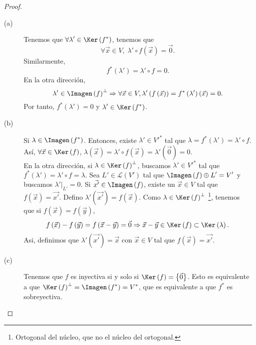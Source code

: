 \begin{proof}
\begin{description}
\item[(a)] Tenemos que $\displaystyle \forall\lambda'\in\Ker\left(f^{*}\right) $, tenemos que 
	\[\forall\vec{x}\in V, \; \lambda' \circ f\left(\vec{x}\right) = \vec{0} .\]
Similarmente, 
\[f^{*}\left(\lambda'\right) = \lambda' \circ f = 0 .\]
En la otra dirección, 
\[\lambda' \in \Imagen\left(f\right)^{\perp } \Rightarrow \forall \vec{x} \in V, \lambda'\left(f\left(\vec{x}\right)\right) = f^{*}\left(\lambda'\right)\left(\vec{x}\right) = 0 .\]
Por tanto, $\displaystyle f^{*}\left(\lambda'\right) = 0 $ y $\displaystyle \lambda' \in \Ker\left(f^{*}\right) $.
\item[(b)] Si $\displaystyle \lambda \in \Imagen\left(f^{*}\right) $. Entonces, existe $\displaystyle \lambda'\in V'^{*} $ tal que $\displaystyle \lambda = f^{*}\left(\lambda'\right) = \lambda' \circ f $. Así, $\displaystyle \forall \vec{x} \in \Ker\left(f\right) $, $\displaystyle \lambda\left(\vec{x}\right) = \lambda'\circ f\left(\vec{x}\right) = \lambda'\left(\vec{0}\right) = 0 $. \\ 
En la otra dirección, si $\displaystyle \lambda \in \Ker\left(f\right)^{\perp } $, buscamos $\displaystyle \lambda'\in V'^{*} $ tal que $\displaystyle f^{*}\left(\lambda'\right) = \lambda' \circ f=\lambda $. Sea $\displaystyle L' \in \mathcal{L}\left(V'\right) $ tal que $\displaystyle \Imagen\left(f\right) \oplus L' = V' $ y buscamos $\displaystyle \lambda'|_{L'} = 0 $. Si $\displaystyle \vec{x'} \in \Imagen\left(f\right) $, existe un $\displaystyle \vec{x}\in V $ tal que $\displaystyle f\left(\vec{x}\right) = \vec{x'} $. Defino $\displaystyle \lambda'\left(\vec{x'}\right) = f\left(\vec{x}\right) $. Como $\displaystyle \lambda \in \Ker\left(f\right)^{\perp } $ \footnote{Ortogonal del núcleo, que no el núcleo del ortogonal.}, tenemos que si $\displaystyle f\left(\vec{x}\right) = f\left(\vec{y}\right) $, 
\[f\left(\vec{x}\right)-f\left(\vec{y}\right) = f\left(\vec{x}-\vec{y}\right) = \vec{0} \Rightarrow \vec{x}-\vec{y} \in \Ker\left(f\right) \subset \Ker\left(\lambda\right) .\]
Asi, definimos que $\displaystyle \lambda'\left(\vec{x'}\right) = \vec{x} $ con $\displaystyle \vec{x} \in V $ tal que $\displaystyle f\left(\vec{x}\right) = \vec{x'} $.
\item[(c)] Tenemos que $\displaystyle f $ es inyectiva si y solo si $\displaystyle \Ker\left(f\right) = \left\{ \vec{0}\right\}  $. Esto es equivalente a que $\displaystyle \Ker\left(f\right)^{\perp } = \Imagen\left(f^{*}\right) = V^{*} $, que es equivalente a que $\displaystyle f^{*} $ es sobreyectiva. 

\end{description}
\end{proof}
